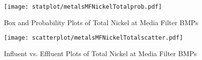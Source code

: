         \begin{figure}[hb]   %
            \centering
            \texttt{[image: statplot/metalsMFNickelTotalprob.pdf]}
            \caption{Box and Probability Plots of Total Nickel at Media Filter BMPs}
        \end{figure}         %
        
        
        \begin{figure}[hb]   %
            \centering
            \texttt{[image: scatterplot/metalsMFNickelTotalscatter.pdf]}
            \caption{Influent vs. Effluent Plots of Total Nickel at Media Filter BMPs}
        \end{figure}         %
        \clearpage
        